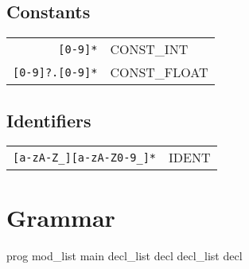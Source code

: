 \documentclass{article}
\begin{document}
		\subsection{Constants}
			\begin{tabular}{rl}
				\texttt{[0-9]*} & CONST\_INT\\
				\texttt{[0-9]?.[0-9]*} & CONST\_FLOAT\\
			\end{tabular}
		\subsection{Identifiers}
			\begin{tabular}{rl}
				\texttt{[a-zA-Z\_][a-zA-Z0-9\_]*} & IDENT\\
			\end{tabular}	
	\section{Grammar}
		prog
			mod\_list main 
		decl\_list
			decl decl\_list 
		decl 
\end{document}
